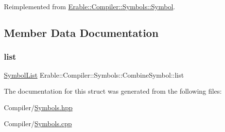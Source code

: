 Reimplemented from \mbox{\hyperlink{class_erable_1_1_compiler_1_1_symbols_1_1_symbol_af5ccb3fb3201fd88ab6ce0e495416c82}{Erable\+::\+Compiler\+::\+Symbols\+::\+Symbol}}.



\subsection{Member Data Documentation}
\mbox{\label{struct_erable_1_1_compiler_1_1_symbols_1_1_combine_symbol_a5bacd166436d523d163b11fb0d343b2e}} 
\subsubsection{\texorpdfstring{list}{list}}
{\footnotesize\ttfamily \mbox{\hyperlink{namespace_erable_1_1_compiler_1_1_symbols_a63e8157d2f729d4689d27bacad42f8ed}{Symbol\+List}} Erable\+::\+Compiler\+::\+Symbols\+::\+Combine\+Symbol\+::list}



The documentation for this struct was generated from the following files\+:\begin{DoxyCompactItemize}
\item 
Compiler/\mbox{\hyperlink{_symbols_8hpp}{Symbols.\+hpp}}\item 
Compiler/\mbox{\hyperlink{_symbols_8cpp}{Symbols.\+cpp}}\end{DoxyCompactItemize}

